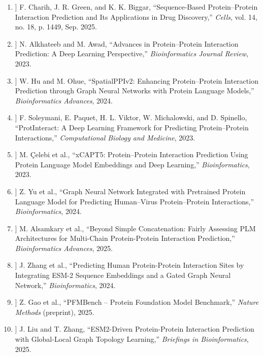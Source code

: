 \documentclass[12pt,a4paper]{report}
\begin{document}
\begin{enumerate}
    \item[[1]] F. Charih, J. R. Green, and K. K. Biggar, ``Sequence-Based Protein–Protein Interaction Prediction and Its Applications in Drug Discovery,'' \textit{Cells}, vol. 14, no. 18, p. 1449, Sep. 2025.
    \item[[2]] N. Alkhateeb and M. Awad, ``Advances in Protein–Protein Interaction Prediction: A Deep Learning Perspective,'' \textit{Bioinformatics Journal Review}, 2023.
    \item[[3]] W. Hu and M. Ohue, ``SpatialPPIv2: Enhancing Protein–Protein Interaction Prediction through Graph Neural Networks with Protein Language Models,'' \textit{Bioinformatics Advances}, 2024.
    \item[[4]] F. Soleymani, E. Paquet, H. L. Viktor, W. Michalowski, and D. Spinello, ``ProtInteract: A Deep Learning Framework for Predicting Protein–Protein Interactions,'' \textit{Computational Biology and Medicine}, 2023.
    \item[[5]] M. \c{C}elebi et al., ``xCAPT5: Protein–Protein Interaction Prediction Using Protein Language Model Embeddings and Deep Learning,'' \textit{Bioinformatics}, 2023.
    \item[[6]] Z. Yu et al., ``Graph Neural Network Integrated with Pretrained Protein Language Model for Predicting Human–Virus Protein–Protein Interactions,'' \textit{Bioinformatics}, 2024.
    \item[[7]] M. Alsamkary et al., ``Beyond Simple Concatenation: Fairly Assessing PLM Architectures for Multi-Chain Protein-Protein Interaction Prediction,'' \textit{Bioinformatics Advances}, 2025.
    \item[[8]] J. Zhang et al., ``Predicting Human Protein-Protein Interaction Sites by Integrating ESM-2 Sequence Embeddings and a Gated Graph Neural Network,'' \textit{Bioinformatics}, 2024.
    \item[[9]] Z. Gao et al., ``PFMBench – Protein Foundation Model Benchmark,'' \textit{Nature Methods} (preprint), 2025.
    \item[[10]] J. Liu and T. Zhang, ``ESM2-Driven Protein-Protein Interaction Prediction with Global-Local Graph Topology Learning,'' \textit{Briefings in Bioinformatics}, 2025.
\end{enumerate}
\end{document}
